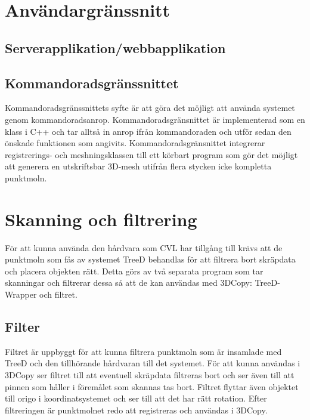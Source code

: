 \documentclass[a4paper,titlepage,12pt]{article}
\begin{document}
\newpage

\section{Användargränssnitt}
\subsection{Serverapplikation/webbapplikation}

\subsection{Kommandoradsgränssnittet}
Kommandoradsgränssnittets syfte är att göra det möjligt att använda systemet genom kommandoradsanrop. Kommandoradsgränsnittet är implementerad som en klass i C++ och tar alltså in anrop ifrån kommandoraden och utför sedan den önskade funktionen som angivits. Kommandoradsgränsnittet integrerar registrerings- och meshningsklassen till ett körbart program som gör det möjligt att generera en utskriftsbar 3D-mesh utifrån flera stycken icke kompletta punktmoln.

\newpage

\section{Skanning och filtrering}
	För att kunna använda den hårdvara som CVL har tillgång till krävs att de punktmoln som fås av systemet TreeD behandlas för att filtrera bort skräpdata och placera objekten rätt. Detta görs av två separata program som tar skanningar och filtrerar dessa så att de kan användas med 3DCopy: TreeD-Wrapper och filtret.
	
	\subsection{Filter}
		Filtret är uppbyggt för att kunna filtrera punktmoln som är insamlade med TreeD och den tillhörande hårdvaran till det systemet. För att kunna användas i 3DCopy ser filtret till att eventuell skräpdata filtreras bort och ser även till att pinnen som håller i föremålet som skannas tas bort. Filtret flyttar även objektet till origo i koordinatsystemet och ser till att det har rätt rotation. Efter filtreringen är punktmolnet redo att registreras och användas i 3DCopy.
		
\end{document}

